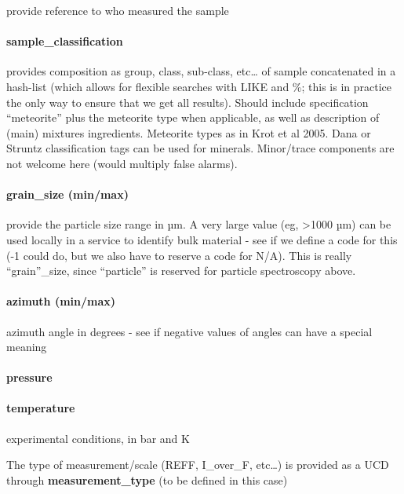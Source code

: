 \documentclass[11pt,a4paper]{ivoa}
\begin{document}
provide reference to who measured the sample

\paragraph{sample\_classification}

provides composition as group, class, sub-class, etc… of sample concatenated in a hash-list (which allows for flexible searches with LIKE and \%; this is in practice the only way to ensure that we get all results). Should include specification ``meteorite'' plus the meteorite type when applicable, as well as description of (main) mixtures ingredients. Meteorite types as in Krot et al 2005. Dana or Struntz classification tags can be used for minerals. Minor/trace components are not welcome here (would multiply false alarms).

\paragraph{\textbf{grain\_size (min/max)}}

provide the particle size range in µm. A very large value (eg, >1000 µm) can be used locally in a service to identify bulk material - see if we define a code for this (-1 could do, but we also have to reserve a code for N/A). This is really ``grain''\_size, since ``particle'' is reserved for particle spectroscopy above.\\

\paragraph{\textbf{azimuth} (min/max)}

azimuth angle in degrees - see if negative values of angles can have a special meaning

\paragraph{pressure}

\paragraph{\textbf{temperature}}

experimental conditions, in bar and K

The type of measurement/scale (REFF, I\_over\_F, etc…) is provided as a UCD through \textbf{measurement\_type} (to be defined in this case)
\end{document}
